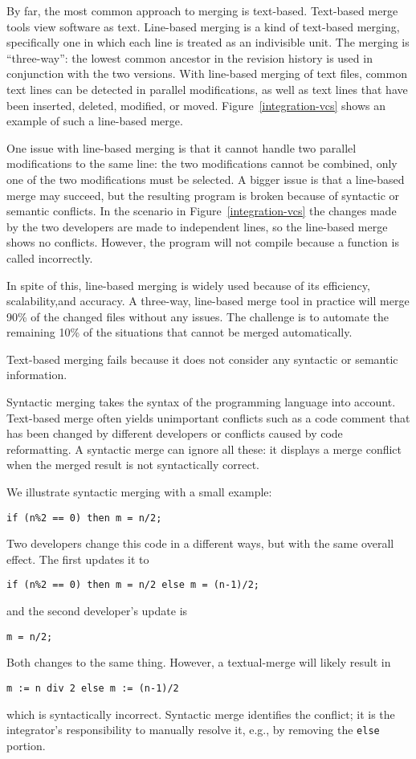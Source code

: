 \documentclass[10pt,openany,twoside,letterpaper,extrafontsizes]{memoir}
\begin{document}
\begin{Spacing}{\commonToolsSpacing}
By far, the most common approach to merging is text-based.
Text-based merge tools view software as text. Line-based
merging is a kind of text-based merging, specifically
one in which each line is treated as an indivisible unit.
The merging is ``three-way'': the lowest common ancestor in the revision history
is used in conjunction with the two versions.
With line-based merging of text files, common text lines
can be detected in parallel modifications, as well as text
lines that have been inserted, deleted, modified, or moved.
Figure~\vref{integration-vcs} shows an example of such a line-based merge.

One issue with line-based merging is that
it cannot handle two parallel modifications to the same line:
the two modifications cannot be combined,
only one of the two modifications must be selected.
A bigger issue is that a line-based merge may succeed, but the resulting
program is broken because of syntactic or semantic conflicts.
In the scenario in Figure~\vref{integration-vcs} the changes
made by the two developers are made to independent lines, so the line-based
merge shows no conflicts. However, the program will not compile because a function
is called incorrectly.

In spite of this, line-based merging is widely used
because of its efficiency, scalability,and accuracy.
A three-way, line-based merge tool in practice will merge
90\% of the changed files without any issues. The challenge is to automate
the remaining 10\% of the situations that cannot be merged automatically.

Text-based merging fails
because it does not
consider any syntactic or semantic information.

Syntactic merging takes the syntax of the programming language
into account. Text-based merge often
yields unimportant conflicts such as a code comment
that has been changed by different developers or
conflicts caused by  code reformatting.
A syntactic merge can ignore all these:
it displays a merge conflict when the merged result is not syntactically correct.

We illustrate syntactic merging with a small example:
\begin{lstlisting}
if (n%2 == 0) then m = n/2;
\end{lstlisting}
Two developers change this code in a different ways,
but with the same overall effect. The first updates it to
\begin{lstlisting}
if (n%2 == 0) then m = n/2 else m = (n-1)/2;
\end{lstlisting}
and the second developer's update is
\begin{lstlisting}
m = n/2;
\end{lstlisting}
Both changes to the same thing. However, a textual-merge will likely result in
\begin{lstlisting}
m := n div 2 else m := (n-1)/2
\end{lstlisting}
which is syntactically incorrect. Syntactic merge identifies the conflict; it is the
integrator's responsibility to manually resolve it, e.g., by
removing the \verb+else+ portion.


\end{Spacing}
\end{document}
